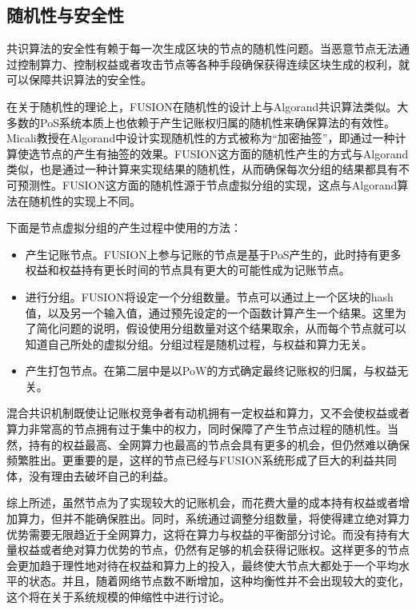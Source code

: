 \documentclass[a4paper,12pt]{article}
\begin{document}
\subsection{随机性与安全性}

共识算法的安全性有赖于每一次生成区块的节点的随机性问题。当恶意节点无法通过控制算力、控制权益或者攻击节点等各种手段确保获得连续区块生成的权利，就可以保障共识算法的安全性。

在关于随机性的理论上，FUSION在随机性的设计上与Algorand共识算法\citep{Jing2017}类似。大多数的PoS系统本质上也依赖于产生记账权归属的随机性来确保算法的有效性。Micali教授在Algorand中设计实现随机性的方式被称为“加密抽签”，即通过一种计算使选节点的产生有抽签的效果。FUSION这方面的随机性产生的方式与Algorand类似，也是通过一种计算来实现结果的随机性，从而确保每次分组的结果都具有不可预测性。FUSION这方面的随机性源于节点虚拟分组的实现，这点与Algorand算法在随机性的实现上不同。

下面是节点虚拟分组的产生过程中使用的方法：

\begin{itemize}[itemindent=1em]
\item 产生记账节点。FUSION上参与记账的节点是基于PoS产生的，此时持有更多权益和权益持有更长时间的节点具有更大的可能性成为记账节点。
\item 进行分组。FUSION将设定一个分组数量。节点可以通过上一个区块的hash值，以及另一个输入值，通过预先设定的一个函数计算产生一个结果。这里为了简化问题的说明，假设使用分组数量对这个结果取余，从而每个节点就可以知道自己所处的虚拟分组。分组过程是随机过程，与权益和算力无关。
\item 产生打包节点。在第二层中是以PoW的方式确定最终记账权的归属，与权益无关。
\end{itemize}

混合共识机制既使让记账权竞争者有动机拥有一定权益和算力，又不会使权益或者算力非常高的节点拥有过于集中的权力，同时保障了产生节点过程的随机性。当然，持有的权益最高、全网算力也最高的节点会具有更多的机会，但仍然难以确保频繁胜出。更重要的是，这样的节点已经与FUSION系统形成了巨大的利益共同体，没有理由去破坏自己的利益。

综上所述，虽然节点为了实现较大的记账机会，而花费大量的成本持有权益或者增加算力，但并不能确保胜出。同时，系统通过调整分组数量，将使得建立绝对算力优势需要无限趋近于全网算力，这将在算力与权益的平衡部分讨论。而没有持有大量权益或者绝对算力优势的节点，仍然有足够的机会获得记账权。这样更多的节点会更加趋于理性地对待在权益和算力上的投入，最终使大节点大都处于一个平均水平的状态。并且，随着网络节点数不断增加，这种均衡性并不会出现较大的变化，这个将在关于系统规模的伸缩性中进行讨论。
\end{document}
